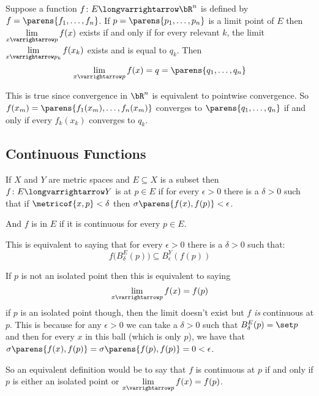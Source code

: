 \documentclass[10pt]{article}
\let\ds=\displaystyle
\begin{document}
\begin{prop*}

    Suppose a function $f\colon E\longvarrightarrow\bR^n$ is defined by $f=\parens{f_1,\dots,f_n}$.
    If $p=\parens{p_1,\dots,p_n}$ is a limit point of $E$ then $\ds\lim_{x\varrightarrow p}f(x)$ exists if and only if for every relevant $k$, the limit $\ds\lim_{x\varrightarrow p_k}f(x_k)$ exists and is
    equal to $q_k$.
    Then
    \[ \lim_{x\varrightarrow p}f(x) = q = \parens{q_1,\dots,q_n} \]

\end{prop*}


This is true since convergence in $\bR^n$ is equivalent to pointwise convergence.
So $f(x_m)=\parens{f_1(x_m),\dots,f_n(x_m)}$ converges to $\parens{q_1,\dots,q_n}$ if and only if every $f_k(x_k)$ converges to $q_k$.

\newpage
\subsection{Continuous Functions}

\begin{defn*}

    If $X$ and $Y$ are metric spaces and $E\subseteq X$ is a subset then $f\colon E\longvarrightarrow Y$ is  at $p\in E$ if for every $\epsilon>0$ there is a $\delta>0$ such that if
    $\metricof{x,p}<\delta$ then $\sigma\parens{f(x),f(p)}<\epsilon$.

    And $f$ is  in $E$ if it is continuous for every $p\in E$.

\end{defn*}

This is equivalent to saying that for every $\epsilon>0$ there is a $\delta>0$ such that:
\[ f\bigl(B_\delta^E(p)\bigr) \subseteq B_\epsilon^Y(f(p)) \]

If $p$ is not an isolated point then this is equivalent to saying
\[ \lim_{x\varrightarrow p}f(x) = f(p) \]
if $p$ is an isolated point though, then the limit doesn't exist but $f$ \emph{is} continuous at $p$.
This is because for any $\epsilon>0$ we can take a $\delta>0$ such that $B_\delta^E(p)=\set p$ and then for every $x$ in this ball (which is only $p$), we have that
$\sigma\parens{f(x),f(p)}=\sigma\parens{f(p),f(p)}=0<\epsilon$.

So an equivalent definition would be to say that $f$ is continuous at $p$ if and only if $p$ is either an isolated point or $\ds\lim_{x\varrightarrow p}f(x)=f(p)$.
\end{document}
